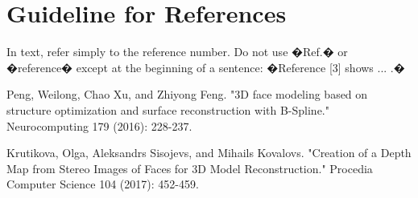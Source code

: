 \documentclass[journal]{IEEEtran}
\begin{document}
\section{Guideline for References}
In text, refer simply to the reference number. Do not use �Ref.� or �reference� except at the beginning of a sentence: �Reference [3] shows ... .� 




\ifCLASSOPTIONcaptionsoff
  \newpage
\fi





%
%
%
\begin{thebibliography}{9}

Peng, Weilong, Chao Xu, and Zhiyong Feng. "3D face modeling based on structure optimization and surface reconstruction with B-Spline." Neurocomputing 179 (2016): 228-237.

Krutikova, Olga, Aleksandrs Sisojevs, and Mihails Kovalovs. "Creation of a Depth Map from Stereo Images of Faces for 3D Model Reconstruction." Procedia Computer Science 104 (2017): 452-459.

\end{thebibliography}

% 
\end{document}
